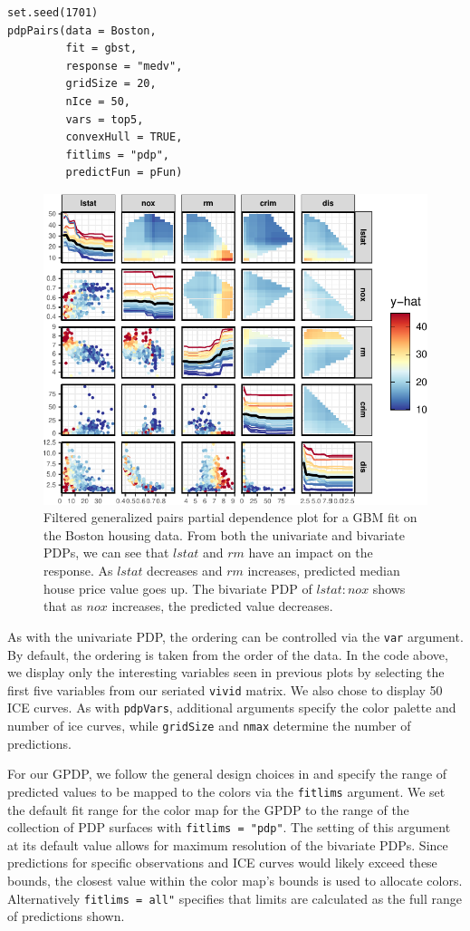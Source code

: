 \begin{verbatim}
set.seed(1701)
pdpPairs(data = Boston,
         fit = gbst,
         response = "medv",
         gridSize = 20,
         nIce = 50,
         vars = top5,
         convexHull = TRUE,
         fitlims = "pdp",
         predictFun = pFun)
\end{verbatim}

\begin{figure}

{\centering \includegraphics[width=0.75\linewidth]{vivid_files/figure-latex/gpdp-1} 

}

\caption{Filtered generalized pairs partial dependence plot for a GBM fit on the Boston housing data. From both the univariate and bivariate PDPs, we can see that $lstat$ and $rm$ have an impact on the response. As $lstat$ decreases and $rm$ increases, predicted median house price value goes up. The bivariate PDP of $lstat:nox$ shows that as $nox$ increases, the predicted value decreases.}\label{fig:gpdp}
\end{figure}

As with the univariate PDP, the ordering can be controlled via the \texttt{var} argument. By default, the ordering is taken from the order of the data. In the code above, we display only the interesting variables seen in previous plots by selecting the first five variables from our seriated \texttt{vivid} matrix. We also chose to display 50 ICE curves. As with \texttt{pdpVars}, additional arguments specify the color palette and number of ice curves, while \texttt{gridSize} and \texttt{nmax} determine the number of predictions.

For our GPDP, we follow the general design choices in  and specify the range of predicted values to be mapped to the colors via the \texttt{fitlims} argument. We set the default fit range for the color map for the GPDP to the range of the collection of PDP surfaces with \texttt{fitlims\ =\ "pdp"}. The setting of this argument at its default value allows for maximum resolution of the bivariate PDPs. Since predictions for specific observations and ICE curves would likely exceed these bounds, the closest value within the color map's bounds is used to allocate colors. Alternatively \texttt{fitlims\ =\ \textquotesingle{}all"} specifies that limits are calculated as the full range of predictions shown.

